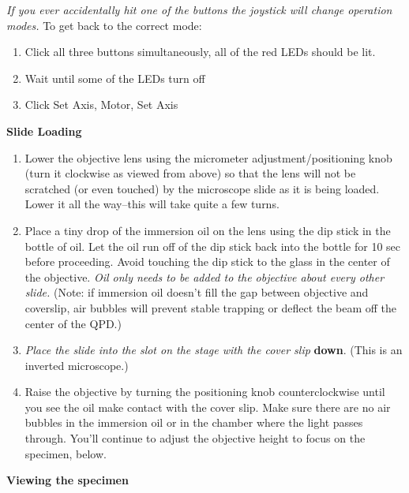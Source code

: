 \documentclass{../lab}
\begin{document}
\emph{If you ever accidentally hit one of the buttons the joystick will change operation modes.} To get back to the correct mode:

\begin{enumerate}
    \item Click all three buttons simultaneously, all of the red LEDs should be lit.

    \item Wait until some of the LEDs turn off

    \item Click Set Axis, Motor, Set Axis
\end{enumerate}

\textbf{Slide Loading}

\begin{enumerate}
    \item Lower the objective lens using the micrometer adjustment/positioning knob (turn it clockwise as viewed from above) so that the lens will not be scratched (or even touched) by the microscope slide as it is being loaded. Lower it all the way--this will take quite a few turns.

    \item Place a tiny drop of the immersion oil on the lens using the dip stick in the bottle of oil. Let the oil run off of the dip stick back into the bottle for 10 sec before proceeding. Avoid touching the dip stick to the glass in the center of the objective. \emph{Oil only needs to be added to the objective about every other slide.} (Note: if immersion oil doesn't fill the gap between objective and coverslip, air bubbles will prevent stable trapping or deflect the beam off the center of the QPD.)

    \item \emph{Place the slide into the slot on the stage with the cover slip} \textbf{down}. (This is an inverted microscope.)

    \item Raise the objective by turning the positioning knob counterclockwise until you see the oil make contact with the cover slip. Make sure there are no air bubbles in the immersion oil or in the chamber where the light passes through. You'll continue to adjust the objective height to focus on the specimen, below.
\end{enumerate}

\textbf{Viewing the specimen}
\end{document}
